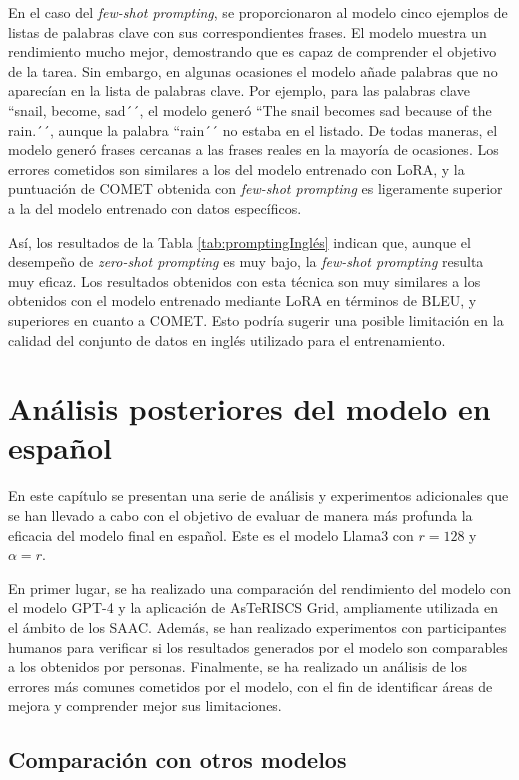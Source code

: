 \documentclass[11pt,spanish,listoffigures,listoftables]{tfgetsinf}
\begin{document}
En el caso del \textit{few-shot prompting}, se proporcionaron al modelo cinco ejemplos de listas de palabras clave con sus correspondientes frases. El modelo muestra un rendimiento mucho mejor, demostrando que es capaz de comprender el objetivo de la tarea. Sin embargo, en algunas ocasiones el modelo añade palabras que no aparecían en la lista de palabras clave. Por ejemplo, para las palabras clave ``snail, become, sad´´, el modelo generó ``The snail becomes sad because of the rain.´´, aunque la palabra ``rain´´ no estaba en el listado. De todas maneras, el modelo generó frases cercanas a las frases reales en la mayoría de ocasiones. Los errores cometidos son similares a los del modelo entrenado con LoRA, y la puntuación de COMET obtenida con \textit{few-shot prompting} es ligeramente superior a la del modelo entrenado con datos específicos.

Así, los resultados de la Tabla \ref{tab:promptingInglés} indican que, aunque el desempeño de \textit{zero-shot prompting} es muy bajo, la \textit{few-shot prompting} resulta muy eficaz. Los resultados obtenidos con esta técnica son muy similares a los obtenidos con el modelo entrenado mediante LoRA en términos de BLEU, y superiores en cuanto a COMET. Esto podría sugerir una posible limitación en la calidad del conjunto de datos en inglés utilizado para el entrenamiento.

\chapter{Análisis posteriores del modelo en español} \label{cap5}

En este capítulo se presentan una serie de análisis y experimentos adicionales que se han llevado a cabo con el objetivo de evaluar de manera más profunda la eficacia del modelo final en español. Este es el modelo Llama3 con $r = 128$ y $\alpha = r$.

En primer lugar, se ha realizado una comparación del rendimiento del modelo con el modelo GPT-4 y la aplicación de AsTeRISCS Grid, ampliamente utilizada en el ámbito de los SAAC. Además, se han realizado experimentos con participantes humanos para verificar si los resultados generados por el modelo son comparables a los obtenidos por personas. Finalmente, se ha realizado un análisis de los errores más comunes cometidos por el modelo, con el fin de identificar áreas de mejora y comprender mejor sus limitaciones.

\section{Comparación con otros modelos} 
\end{document}
